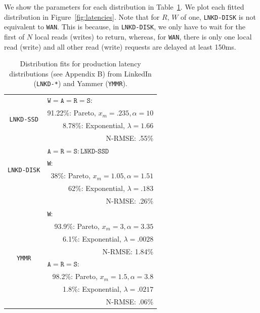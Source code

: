 \documentclass{vldb}
\begin{document}
We show the parameters for each distribution in
Table~\ref{table:fits}. We plot each fitted distribution in
Figure~\ref{fig:latencies}.  Note that for $R$, $W$ of one,
\texttt{LNKD-DISK} is not equivalent to \texttt{WAN}.  This is
because, in \texttt{LNKD-DISK}, we only have to wait for the first of
$N$ local reads (writes) to return, whereas, for \texttt{WAN}, there
is only one local read (write) and all other read (write) requests are
delayed at least 150ms.


\begin{table}
\centering
\begin{tabular}{|c|r|}
\hline
\multirow{4}{*}{\texttt{LNKD-SSD}} & \multicolumn{1}{|l|}{$\texttt{W} = \texttt{A}= \texttt{R} = \texttt{S}:$} \\
& 91.22\%: Pareto, $x_m=.235, \alpha=10$\\
& 8.78\%: Exponential, $\lambda = 1.66$ \\
& N-RMSE: .55\%\\\hline
\multirow{4}{*}{\texttt{LNKD-DISK}} & \multicolumn{1}{|l|}{$\texttt{A}= \texttt{R} = \texttt{S}: \texttt{LNKD-SSD}$}\\\cline{2-2}
& \multicolumn{1}{|l|}{\texttt{W}:}\\
& 38\%: Pareto, $x_m=1.05, \alpha=1.51$\\
& \hfill 62\%: Exponential, $\lambda = .183$ \\
& N-RMSE: .26\%\\
\hline
\multirow{8}{*}{\texttt{YMMR}} & \multicolumn{1}{|l|}{\texttt{W}:} \\
& 93.9\%: Pareto, $x_m=3, \alpha=3.35$\\
& 6.1\%: Exponential, $\lambda = .0028$ \\
& N-RMSE: 1.84\%\\\cline{2-2}
& \multicolumn{1}{|l|}{$\texttt{A}= \texttt{R} = \texttt{S}:$}\\
& 98.2\%: Pareto, $x_m=1.5, \alpha=3.8$\\
& 1.8\%: Exponential, $\lambda=.0217$\\
& N-RMSE: .06\%\\
\hline
\end{tabular}
\vspace{-6pt}
\caption{Distribution fits for production latency distributions (see Appendix B) from LinkedIn (\texttt{LNKD-*}) and Yammer (\texttt{YMMR}).}
\vspace{-12pt}
\label{table:fits}
\end{table}
\end{document}
